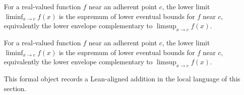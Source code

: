\begin{definition}
\label{def:liminf-at}
For a real-valued function $f$ near an adherent point $c$, the lower limit $\liminf_{x\to c}f(x)$ is the supremum of lower eventual bounds for $f$ near $c$, equivalently the lower envelope complementary to $\limsup_{x\to c}f(x)$.
\end{definition}

\begin{remark*}
For a real-valued function $f$ near an adherent point $c$, the lower limit $\liminf_{x\to c}f(x)$ is the supremum of lower eventual bounds for $f$ near $c$, equivalently the lower envelope complementary to $\limsup_{x\to c}f(x)$.
\end{remark*}

\begin{remark*}[Interpretation]
This formal object records a Lean-aligned addition in the local language of this section.
\end{remark*}

\begin{dependencies}
\NoLocalDependencies
\end{dependencies}
